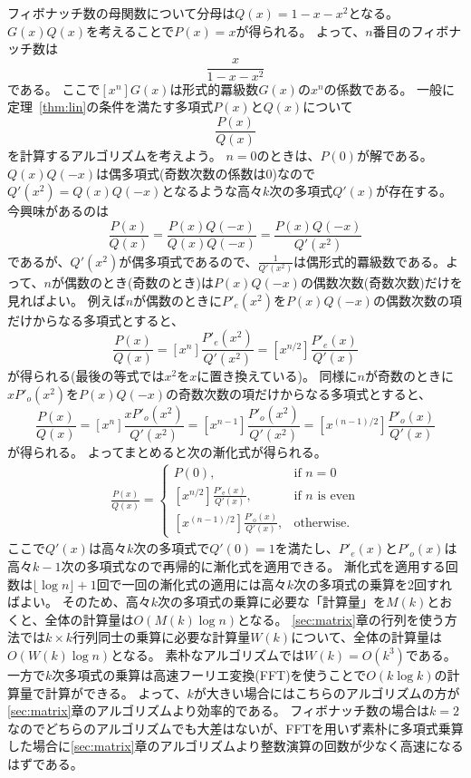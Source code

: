 \documentclass[a4paper,twoside,onecolumn,openany,article]{memoir}
\theoremstyle{plain}
\theoremstyle{remark}
\begin{document}
フィボナッチ数の母関数について分母は$Q(x)=1-x-x^2$となる。$G(x)Q(x)$を考えることで$P(x)=x$が得られる。
よって、$n$番目のフィボナッチ数は
\begin{equation*}
[x^n] \frac{x}{1-x-x^2}
\end{equation*}
である。
ここで$[x^n]G(x)$は形式的羃級数$G(x)$の$x^n$の係数である。
一般に定理~\ref{thm:lin}の条件を満たす多項式$P(x)$と$Q(x)$について
\begin{equation*}
[x^n]\frac{P(x)}{Q(x)}
\end{equation*}
を計算するアルゴリズムを考えよう。
$n=0$のときは、$P(0)$が解である。
$Q(x)Q(-x)$は偶多項式(奇数次数の係数は0)なので$Q'(x^2)=Q(x)Q(-x)$となるような高々$k$次の多項式$Q'(x)$が存在する。
今興味があるのは
\begin{equation*}
\frac{P(x)}{Q(x)} = \frac{P(x)Q(-x)}{Q(x)Q(-x)}
= \frac{P(x)Q(-x)}{Q'(x^2)}
\end{equation*}
であるが、$Q'(x^2)$が偶多項式であるので、$\frac1{Q'(x^2)}$は偶形式的羃級数である。よって、$n$が偶数のとき(奇数のとき)は$P(x)Q(-x)$の偶数次数(奇数次数)だけを見ればよい。
例えば$n$が偶数のときに$P'_e(x^2)$を$P(x)Q(-x)$の偶数次数の項だけからなる多項式とすると、
\begin{equation*}
[x^n]\frac{P(x)}{Q(x)} = [x^n]\frac{P'_e(x^2)}{Q'(x^2)}
= [x^{n/2}]\frac{P'_e(x)}{Q'(x)}
\end{equation*}
が得られる(最後の等式では$x^2$を$x$に置き換えている)。
同様に$n$が奇数のときに$xP'_o(x^2)$を$P(x)Q(-x)$の奇数次数の項だけからなる多項式とすると、
\begin{equation*}
[x^n]\frac{P(x)}{Q(x)} = [x^n]\frac{xP'_o(x^2)}{Q'(x^2)}
= [x^{n-1}]\frac{P'_o(x^2)}{Q'(x^2)} = [x^{(n-1)/2}]\frac{P'_o(x)}{Q'(x)}
\end{equation*}
が得られる。
よってまとめると次の漸化式が得られる。
\begin{align*}
[x^n]\frac{P(x)}{Q(x)}
=
\begin{cases}
P(0),&\text{if } n = 0\\
[x^{n/2}] \frac{P'_\mathrm{e}(x)}{Q'(x)},&\text{if $n$ is even}\\
[x^{(n-1)/2}] \frac{P'_\mathrm{o}(x)}{Q'(x)},&\text{otherwise.}
\end{cases}
\end{align*}
ここで$Q'(x)$は高々$k$次の多項式で$Q'(0)=1$を満たし、$P'_e(x)$と$P'_o(x)$は高々$k-1$次の多項式なので再帰的に漸化式を適用できる。
漸化式を適用する回数は$\lfloor \log n \rfloor + 1$回で一回の漸化式の適用には高々$k$次の多項式の乗算を2回すればよい。
そのため、高々$k$次の多項式の乗算に必要な「計算量」を$M(k)$とおくと、全体の計算量は$O(M(k)\log n)$となる。
\ref{sec:matrix}章の行列を使う方法では$k\times k$行列同士の乗算に必要な計算量$W(k)$について、全体の計算量は$O(W(k)\log n)$となる。
素朴なアルゴリズムでは$W(k)=O(k^3)$である。一方で$k$次多項式の乗算は高速フーリエ変換(FFT)を使うことで$O(k\log k)$の計算量で計算ができる。
よって、$k$が大きい場合にはこちらのアルゴリズムの方が\ref{sec:matrix}章のアルゴリズムより効率的である。
フィボナッチ数の場合は$k=2$なのでどちらのアルゴリズムでも大差はないが、FFTを用いず素朴に多項式乗算した場合に\ref{sec:matrix}章のアルゴリズムより整数演算の回数が少なく高速になるはずである。
\end{document}
